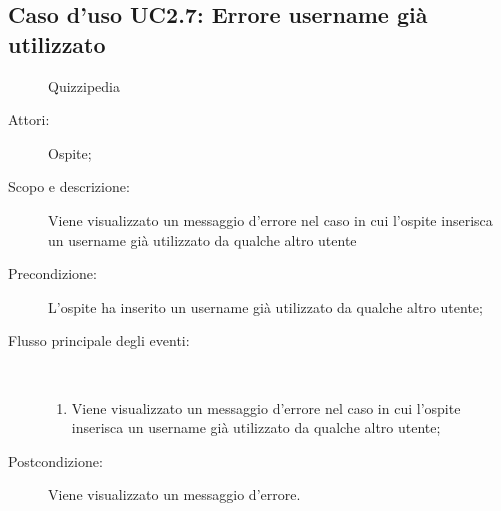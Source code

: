 \subsection{Caso d'uso UC2.7: Errore username già utilizzato}
	\begin{figure}[H]
		\centering
		\begin{resizedtikzpicture}{\textwidth}
		\begin{umlsystem}[x=0, fill=lightgray!20]{Quizzipedia}
		\end{umlsystem}
		\end{resizedtikzpicture}
		\caption{}
	\end{figure}
\begin{description}
\item[Attori:] Ospite;
\item[Scopo e descrizione:] Viene visualizzato un messaggio d'errore nel caso in cui l'ospite inserisca un username già utilizzato da qualche altro utente
      \item[Precondizione:] L'ospite ha inserito un username già utilizzato da qualche altro utente;

        \item[Flusso principale degli eventi:] \ 
 \begin{enumerate}
          \item Viene visualizzato un messaggio d'errore nel caso in cui l'ospite inserisca un username già utilizzato da qualche altro utente;

      \end{enumerate}
    \item[Postcondizione:] Viene visualizzato un messaggio d'errore.
  \end{description}
\hypertarget{UC3}{}
